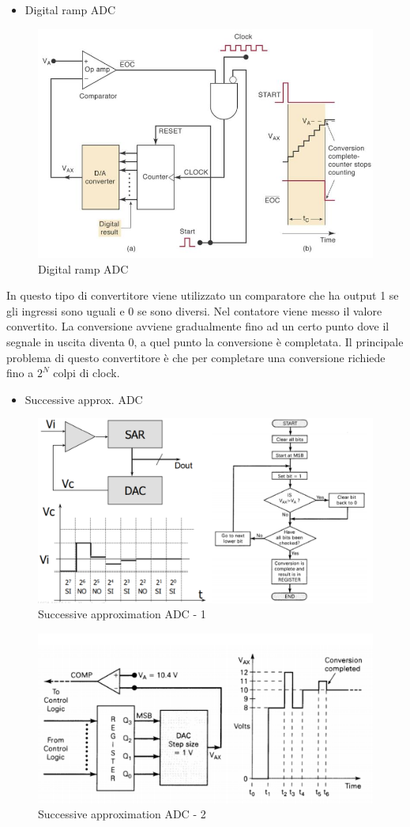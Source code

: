\documentclass[
]{book}
\providecommand{\tightlist}{%
  \setlength{\itemsep}{0pt}\setlength{\parskip}{0pt}}
\begin{document}
\begin{itemize}
\tightlist
\item
  Digital ramp ADC
\end{itemize}

\begin{figure}
\centering
\includegraphics[width=0.5\linewidth,height=\textheight,keepaspectratio]{immagini/43.png}
\caption{Digital ramp ADC}
\end{figure}

In questo tipo di convertitore viene utilizzato un comparatore che ha
output 1 se gli ingressi sono uguali e 0 se sono diversi. Nel contatore
viene messo il valore convertito. La conversione avviene gradualmente
fino ad un certo punto dove il segnale in uscita diventa 0, a quel punto
la conversione è completata. \newline Il principale problema di questo
convertitore è che per completare una conversione richiede fino a
\(2^{N}\) colpi di clock.

\begin{itemize}
\tightlist
\item
  Successive approx. ADC
\end{itemize}

\begin{figure}
\centering
\includegraphics[width=0.4\linewidth,height=\textheight,keepaspectratio]{immagini/44.png}
\caption{Successive approximation ADC - 1}
\end{figure}

\begin{figure}
\centering
\includegraphics[width=0.4\linewidth,height=\textheight,keepaspectratio]{immagini/45.png}
\caption{Successive approximation ADC - 2}
\end{figure}
\end{document}
